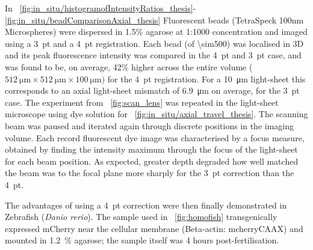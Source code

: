 In \figurename~\ref{fig:in_situ/histogramofIntensityRatios_thesis}-\ref{fig:in_situ/beadComparisonAxial_thesis} Fluorescent beads (TetraSpeck 100nm Microspheres) were dispersed in 1.5\% agarose at 1:1000 concentration and imaged using a 3~pt and a 4~pt registration.
Each bead (of \SI{\sim500}{}) was localised in \gls{3D} %
and its peak fluorescence intensity was compared in the 4~pt and 3~pt case, and was found to be, on average,
42\% higher across the entire volume (\(\SI{512}{\micro\metre} \times \SI{512}{\micro\metre}\times \SI{100}{\micro\metre})\) for the 4~pt registration.
For a \SI{10}{\micro\metre} \gls{light-sheet} this corresponds to an axial light-sheet mismatch of \SI{6.9}{\micro\metre} on average, for the 3~pt case. %
The experiment from \figurename~\ref{fig:scan_lens} was repeated in the \gls{light-sheet} microscope using dye solution for \figurename~\ref{fig:in_situ/axial_travel_thesis}.
The scanning beam was paused and iterated again through discrete positions in the imaging volume.
Each record fluorescent dye image was characterised by a focus measure, obtained by finding the intensity maximum through the focus of the light-sheet for each beam position.
As expected, greater depth degraded how well matched the beam was to the focal plane more sharply for the 3~pt correction than the 4~pt.

The advantages of using a 4~pt correction were then finally demonstrated in Zebrafish (\emph{Danio rerio}).
The sample used in \figurename~\ref{fig:homofish} transgenically expressed mCherry near the cellular membrane (Beta-actin: mcherryCAAX) and mounted in 1.2~\% agarose;
the sample itself was 4 hours post-fertilisation.

